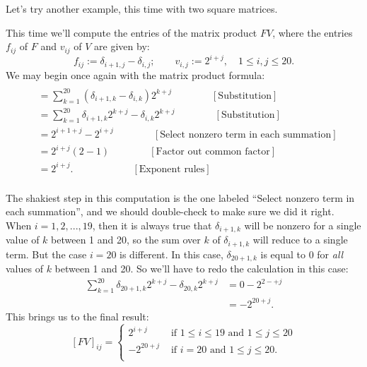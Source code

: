 Let's try another example, this time with two square matrices.

\begin{example}{}
This time we'll compute the entries of the matrix product $FV$, where the entries $f_{ij}$ of $F$ and $v_{ij}$ of $V$ are given by:
\[
f_{ij} := \delta_{i+1,j} - \delta_{i,j}; \qquad v_{i,j} := 2^{i+j}, \quad 1 \le i,j \le 20.
\]
We may begin once again with the matrix product formula:
\begin{align*}
[FV_{ij} &= \sum_{k=1}^{20} f_{ik}v_{kj} \qquad \qquad [\text{Matrix mulitplication formula }]\\ 
&=  \sum_{k=1}^{20} (\delta_{i+1,k} - \delta_{i,k})2^{k+j} \qquad \qquad [\text{Substitution}]\\
&=  \sum_{k=1}^{20} \delta_{i+1,k}2^{k+j} - \delta_{i,k}2^{k+j} \qquad \qquad [\text{Substitution}]\\
&= 2^{i+1+j} - 2^{i+j} \qquad \qquad [\text{Select nonzero term in each summation}]\\
&= 2^{i+j}(2 - 1) \qquad \qquad [\text{Factor out common factor}]\\
&= 2^{i+j}. \qquad \qquad \qquad [\text{Exponent rules}]\\
\end{align*}

The shakiest step in this computation is the one labeled ``Select nonzero term in each summation'', and we should double-check to make sure we did it right.  When $i = 1,2,...,19$, then it is always true that 
$\delta_{i+1,k}$ will be nonzero for a single value of $k$ between 1 and 20, so the sum over $k$ of $\delta_{i+1,k}$ will reduce to a single term. But the case $i=20$ is different.  In this case, $\delta_{20+1,k}$ is equal to 0 for \emph{all} values of $k$ between 1 and 20. So we'll have to redo the calculation in this case:
\begin{align*}
\sum_{k=1}^{20} \delta_{20+1,k}2^{k+j} - \delta_{20,k}2^{k+j} &= 0 - 2^{2-+j}\\
&= - 2^{20+j}.
\end{align*}
This brings us to the final result: 
\[
[FV]_{ij} = \begin{cases}  2^{i+j} & \text{ if } 1 \le i \le 19 \text{ and } 1 \le j \le 20\\
					- 2^{20+j}	  & \text{ if } i=20 \text{ and } 1 \le j \le 20.\\
                   \end{cases}
\]
 \end{example}

